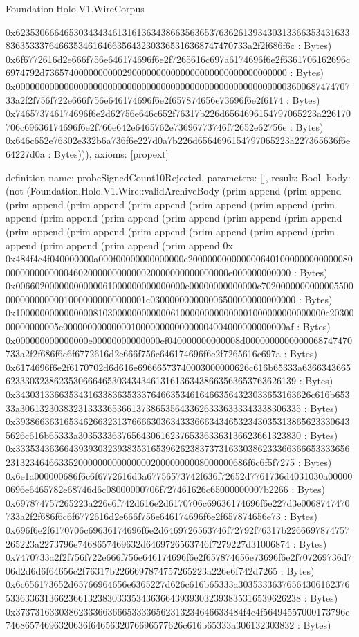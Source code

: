 \begin{lexlean}{Foundation.Holo.V1.WireCorpus}
\begin{semanticmodule}
{0x62353066646530343434613161363438663563653763626139343031336635343163383635333764663534616466356432303365316368747470733a2f2f686f6c : Bytes) 0x6f6772616d2e666f756e646174696f6e2f7265616c697a6174696f6e2f6361706162696c6974792d73657400000000002900000000000000000000000000000000 : Bytes) 0x00000000000000000000000000000000000000000000000000000000360068747470733a2f2f756f722e666f756e646174696f6e2f657874656e73696f6e2f6174 : Bytes) 0x746573746174696f6e2d62756e646c652f76317b226d6564696154797065223a226170706c69636174696f6e2f766e642e6465762e73696773746f72652e62756e : Bytes) 0x646c652e76302e332b6a736f6e227d0a7b226d6564696154797065223a227365636f6e64227d0a : Bytes))),
  axioms: [propext]
}

definition{
  name: probeSignedCount10Rejected,
  parameters: [],
  result: Bool,
  body: (not (Foundation.Holo.V1.Wire::validArchiveBody (prim append (prim append (prim append (prim append (prim append (prim append (prim append (prim append (prim append (prim append (prim append (prim append (prim append (prim append (prim append (prim append (prim append (prim append (prim append (prim append (prim append (prim append 0x 0x484f4c4f040000000a000f00000000000000e20000000000000064010000000000000800000000000000460200000000000020000000000000000e000000000000 : Bytes) 0x00660200000000000061000000000000000e00000000000000c702000000000000550000000000000010000000000000001c030000000000006500000000000000 : Bytes) 0x1000000000000000810300000000000061000000000000001000000000000000e2030000000000005e0000000000000010000000000000004004000000000000af : Bytes) 0x000000000000000e00000000000000ef040000000000008d0000000000000068747470733a2f2f686f6c6f6772616d2e666f756e646174696f6e2f7265616c697a : Bytes) 0x6174696f6e2f6170702d6d616e69666573740003000000626c616b65333a6366343665623330323862353066646530343434613161363438663563653763626139 : Bytes) 0x3430313366353431633836353337646635346164663564323033653163626c616b65333a3061323038323133336536613738653564336263336333343338306335 : Bytes) 0x3938663631653462663231376666303634333666343465323430353138656233306435626c616b65333a3035333637656430616237653363363136623661323830 : Bytes) 0x33353436366439393032393835316539626238373731633038623336636665333365623132346466335200000000000000020000000008000000686f6c6f5f7275 : Bytes) 0x6e1a000000686f6c6f6772616d3a67756573742f636f72652d7761736d4031030a000000696e6465782e68746d6c08000000706f727461626c65000000007b2266 : Bytes) 0x697874757265223a226e6f742d616e2d6170706c69636174696f6e227d3e0068747470733a2f2f686f6c6f6772616d2e666f756e646174696f6e2f657874656e73 : Bytes) 0x696f6e2f6170706c69636174696f6e2d6469726563746f72792f76317b2266697874757265223a2273796e7468657469632d6469726563746f7279227d31006874 : Bytes) 0x7470733a2f2f756f722e666f756e646174696f6e2f657874656e73696f6e2f707269736d706d2d6d6f64656c2f76317b2266697874757265223a226e6f742d7265 : Bytes) 0x6c656173652d65766964656e6365227d626c616b65333a303533363765643061623765336336313662366132383033353436366439393032393835316539626238 : Bytes) 0x37373163303862333663666533336562313234646633484f4c4f56494557000173796e74686574696320636f6465632076696577626c616b65333a306132303832 : Bytes) }
\end{semanticmodule}
\end{lexlean}
